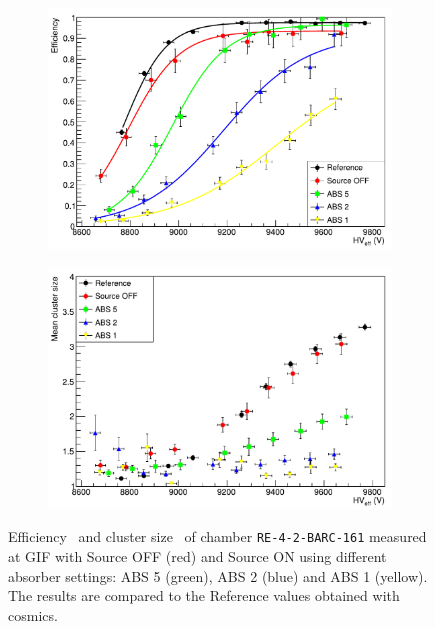 	\begin{figure}[H]
    	\begin{subfigure}{.5\linewidth}
			\centering
			\includegraphics[width = \linewidth]{fig/chapt5/Efficiency.pdf}
        	\caption{\label{fig:GIFEffCS:A}}
    	\end{subfigure}
    	\begin{subfigure}{.5\linewidth}
			\centering
			\includegraphics[width = \linewidth]{fig/chapt5/Cluster-Size.pdf}
        	\caption{\label{fig:GIFEffCS:B}}
    	\end{subfigure}
		\caption{\label{fig:GIFEffCS} Efficiency~ and cluster size~ of chamber \texttt{RE-4-2-BARC-161} measured at GIF with Source OFF (red) and Source ON using different absorber settings: ABS 5 (green), ABS 2 (blue) and ABS 1 (yellow). The results are compared to the Reference values obtained with cosmics.}
	\end{figure}
	
